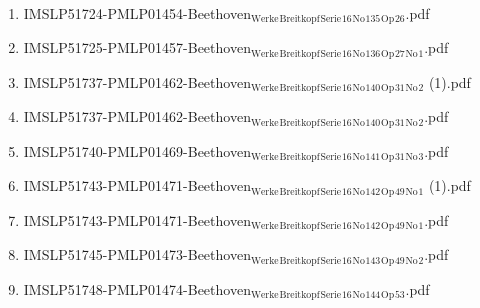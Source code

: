 \documentclass[11pt]{article}
\begin{document}
\begin{enumerate}
\begin{enumerate}
\begin{enumerate}
\item IMSLP51724-PMLP01454-Beethoven$_{\text{Werke}}$$_{\text{Breitkopf}}$$_{\text{Serie}}$$_{\text{16}}$$_{\text{No}}$$_{\text{135}}$$_{\text{Op}}$$_{\text{26}}$.pdf
\label{sec-1-1-1-1-44-9-6-8-35}

\item IMSLP51725-PMLP01457-Beethoven$_{\text{Werke}}$$_{\text{Breitkopf}}$$_{\text{Serie}}$$_{\text{16}}$$_{\text{No}}$$_{\text{136}}$$_{\text{Op}}$$_{\text{27}}$$_{\text{No}}$$_{\text{1}}$.pdf
\label{sec-1-1-1-1-44-9-6-8-36}

\item IMSLP51737-PMLP01462-Beethoven$_{\text{Werke}}$$_{\text{Breitkopf}}$$_{\text{Serie}}$$_{\text{16}}$$_{\text{No}}$$_{\text{140}}$$_{\text{Op}}$$_{\text{31}}$$_{\text{No}}$$_{\text{2}}$ (1).pdf
\label{sec-1-1-1-1-44-9-6-8-37}

\item IMSLP51737-PMLP01462-Beethoven$_{\text{Werke}}$$_{\text{Breitkopf}}$$_{\text{Serie}}$$_{\text{16}}$$_{\text{No}}$$_{\text{140}}$$_{\text{Op}}$$_{\text{31}}$$_{\text{No}}$$_{\text{2}}$.pdf
\label{sec-1-1-1-1-44-9-6-8-38}

\item IMSLP51740-PMLP01469-Beethoven$_{\text{Werke}}$$_{\text{Breitkopf}}$$_{\text{Serie}}$$_{\text{16}}$$_{\text{No}}$$_{\text{141}}$$_{\text{Op}}$$_{\text{31}}$$_{\text{No}}$$_{\text{3}}$.pdf
\label{sec-1-1-1-1-44-9-6-8-39}

\item IMSLP51743-PMLP01471-Beethoven$_{\text{Werke}}$$_{\text{Breitkopf}}$$_{\text{Serie}}$$_{\text{16}}$$_{\text{No}}$$_{\text{142}}$$_{\text{Op}}$$_{\text{49}}$$_{\text{No}}$$_{\text{1}}$ (1).pdf
\label{sec-1-1-1-1-44-9-6-8-40}

\item IMSLP51743-PMLP01471-Beethoven$_{\text{Werke}}$$_{\text{Breitkopf}}$$_{\text{Serie}}$$_{\text{16}}$$_{\text{No}}$$_{\text{142}}$$_{\text{Op}}$$_{\text{49}}$$_{\text{No}}$$_{\text{1}}$.pdf
\label{sec-1-1-1-1-44-9-6-8-41}

\item IMSLP51745-PMLP01473-Beethoven$_{\text{Werke}}$$_{\text{Breitkopf}}$$_{\text{Serie}}$$_{\text{16}}$$_{\text{No}}$$_{\text{143}}$$_{\text{Op}}$$_{\text{49}}$$_{\text{No}}$$_{\text{2}}$.pdf
\label{sec-1-1-1-1-44-9-6-8-42}

\item IMSLP51748-PMLP01474-Beethoven$_{\text{Werke}}$$_{\text{Breitkopf}}$$_{\text{Serie}}$$_{\text{16}}$$_{\text{No}}$$_{\text{144}}$$_{\text{Op}}$$_{\text{53}}$.pdf
\label{sec-1-1-1-1-44-9-6-8-43}


\end{enumerate}
\end{enumerate}
\end{enumerate}
\end{document}
